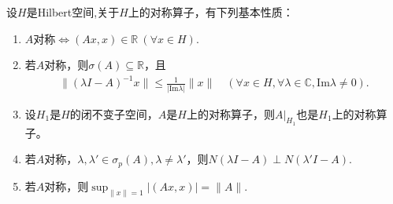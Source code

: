 \documentclass[../../main.tex]{subfiles}%
\begin{document}
\begin{proposition}
设$H$是Hilbert空间,关于$H$上的对称算子，有下列基本性质：
\begin{enumerate}[(1)]
\item $A$对称$\iff(Ax,x)\in\mathbb{R}\ (\forall x\in H)$.
\item 若$A$对称，则$\sigma(A)\subseteq\mathbb{R}$，且
\begin{align*}
\|(\lambda I-A)^{-1}x\|\leqslant\frac{1}{|\mathrm{Im}\lambda|}\|x\|\quad(\forall x\in H,\forall\lambda\in\mathbb{C},\mathrm{Im}\lambda\neq0).
\end{align*}
\item 设$H_1$是$H$的闭不变子空间，$A$是$H$上的对称算子，则$A|_{H_1}$也是$H_1$上的对称算子。
\item 若$A$对称，$\lambda,\lambda'\in\sigma_p(A),\lambda\neq\lambda'$，则$N(\lambda I-A)\perp N(\lambda'I-A)$.
\item 若$A$对称，则$\displaystyle\sup_{\|x\|=1}|(Ax,x)|=\|A\|$.
\end{enumerate}
\end{proposition}
\end{document}
